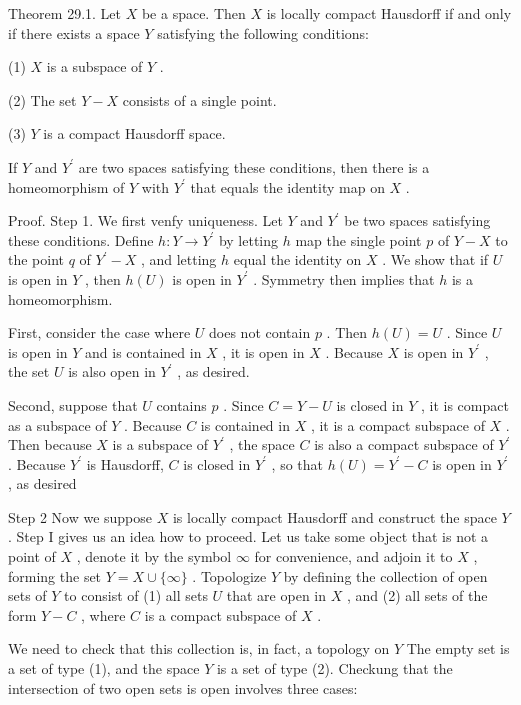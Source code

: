 \documentclass[10pt]{article}
\begin{document}
Theorem 29.1. Let \(X\) be a space. Then \(X\) is locally compact Hausdorff if and only if there exists a space \(Y\) satisfying the following conditions:

(1) \(X\) is a subspace of \(Y\) .

(2) The set \(Y - X\) consists of a single point.

(3) \(Y\) is a compact Hausdorff space.

If \(Y\) and \({Y}^{\prime }\) are two spaces satisfying these conditions, then there is a homeomorphism of \(Y\) with \({Y}^{\prime }\) that equals the identity map on \(X\) .

Proof. Step 1. We first venfy uniqueness. Let \(Y\) and \({Y}^{\prime }\) be two spaces satisfying these conditions. Define \(h : Y \rightarrow  {Y}^{\prime }\) by letting \(h\) map the single point \(p\) of \(Y - X\) to the point \(q\) of \({Y}^{\prime } - X\) , and letting \(h\) equal the identity on \(X\) . We show that if \(U\) is open in \(Y\) , then \(h\left( U\right)\) is open in \({Y}^{\prime }\) . Symmetry then implies that \(h\) is a homeomorphism.

First, consider the case where \(U\) does not contain \(p\) . Then \(h\left( U\right)  = U\) . Since \(U\) is open in \(Y\) and is contained in \(X\) , it is open in \(X\) . Because \(X\) is open in \({Y}^{\prime }\) , the set \(U\) is also open in \({Y}^{\prime }\) , as desired.

Second, suppose that \(U\) contains \(p\) . Since \(C = Y - U\) is closed in \(Y\) , it is compact as a subspace of \(Y\) . Because \(C\) is contained in \(X\) , it is a compact subspace of \(X\) . Then because \(X\) is a subspace of \({Y}^{\prime }\) , the space \(C\) is also a compact subspace of \({Y}^{\prime }\) . Because \({Y}^{\prime }\) is Hausdorff, \(C\) is closed in \({Y}^{\prime }\) , so that \(h\left( U\right)  = {Y}^{\prime } - C\) is open in \({Y}^{\prime }\) , as desired

Step 2 Now we suppose \(X\) is locally compact Hausdorff and construct the space \(Y\) . Step I gives us an idea how to proceed. Let us take some object that is not a point of \(X\) , denote it by the symbol \(\infty\) for convenience, and adjoin it to \(X\) , forming the set \(Y = X \cup  \{ \infty \}\) . Topologize \(Y\) by defining the collection of open sets of \(Y\) to consist of (1) all sets \(U\) that are open in \(X\) , and (2) all sets of the form \(Y - C\) , where \(C\) is a compact subspace of \(X\) .

We need to check that this collection is, in fact, a topology on \(Y\) The empty set is a set of type (1), and the space \(Y\) is a set of type (2). Checkung that the intersection of two open sets is open involves three cases:
\end{document}
